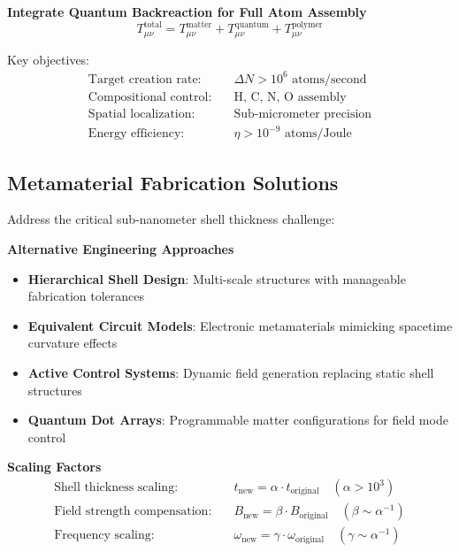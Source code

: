 \documentclass[11pt]{article}
\begin{document}
\textbf{Integrate Quantum Backreaction for Full Atom Assembly}
\begin{equation}
T_{\mu\nu}^{\text{total}} = T_{\mu\nu}^{\text{matter}} + T_{\mu\nu}^{\text{quantum}} + T_{\mu\nu}^{\text{polymer}}
\end{equation}

Key objectives:
\begin{align}
\text{Target creation rate:} &\quad \Delta N > 10^{6} \text{ atoms/second} \\
\text{Compositional control:} &\quad \text{H, C, N, O assembly} \\
\text{Spatial localization:} &\quad \text{Sub-micrometer precision} \\
\text{Energy efficiency:} &\quad \eta > 10^{-9} \text{ atoms/Joule}
\end{align}

\subsection{Metamaterial Fabrication Solutions}

Address the critical sub-nanometer shell thickness challenge:

\textbf{Alternative Engineering Approaches}
\begin{itemize}
\item \textbf{Hierarchical Shell Design}: Multi-scale structures with manageable fabrication tolerances
\item \textbf{Equivalent Circuit Models}: Electronic metamaterials mimicking spacetime curvature effects
\item \textbf{Active Control Systems}: Dynamic field generation replacing static shell structures
\item \textbf{Quantum Dot Arrays}: Programmable matter configurations for field mode control
\end{itemize}

\textbf{Scaling Factors}
\begin{align}
\text{Shell thickness scaling:} &\quad t_{\text{new}} = \alpha \cdot t_{\text{original}} \quad (\alpha > 10^{3}) \\
\text{Field strength compensation:} &\quad B_{\text{new}} = \beta \cdot B_{\text{original}} \quad (\beta \sim \alpha^{-1}) \\
\text{Frequency scaling:} &\quad \omega_{\text{new}} = \gamma \cdot \omega_{\text{original}} \quad (\gamma \sim \alpha^{-1})
\end{align}
\end{document}
